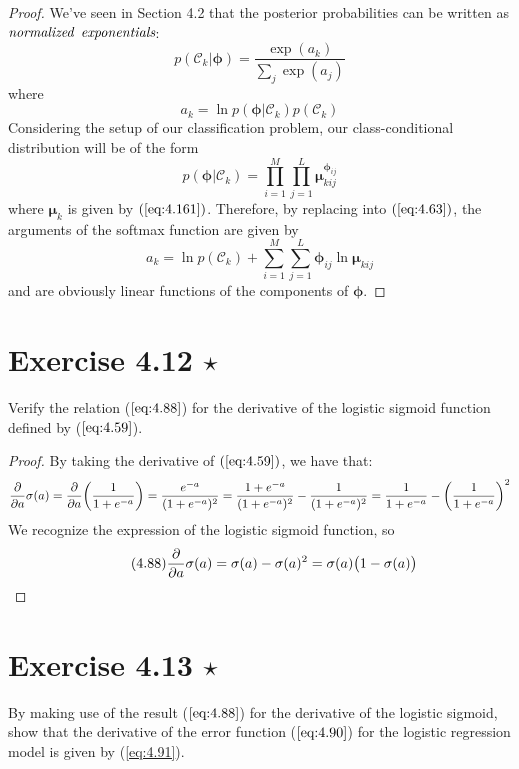 \begin{proof}
    We've seen in Section 4.2 that the posterior probabilities
    can be written as $\emph{normalized}$ $\emph{exponentials}$:
    \begin{equation}\label{eq:4.62}\tag{4.62}
        p(\mathcal{C}_k | \bm{\phi}) 
        = \frac{\exp(a_k)}{\sum_{j} \exp(a_j)}
    \end{equation}
    where
    \begin{equation}\label{eq:4.63}\tag{4.63}
        a_k = \ln p(\bm{\phi} | \mathcal{C}_k)p(\mathcal{C}_k)
    \end{equation}
    Considering the setup of our classification problem,
    our class-conditional distribution will be of the form
    \[
        p(\bm{\phi} | \mathcal{C}_k) 
        = \prod_{i = 1}^M \prod_{j = 1}^L
            \bm{\mu}_{kij}^{\bm{\phi}_{ij}}
    \] 
    where $\bm{\mu}_k$ is given by $(\ref{eq:4.161})$. 
    Therefore,
    by replacing into $(\ref{eq:4.63})$, the arguments
    of the softmax function are given by
    \[
        a_k = \ln p(\mathcal{C}_k) 
        + \sum_{i=1}^{M} \sum_{j=1}^{L} \bm{\phi}_{ij} \ln \bm{\mu}_{kij} 
    \] 
    and are obviously linear functions of the components
    of $\bm{\phi}$.
\end{proof}

\section*{Exercise 4.12 $\star$}
Verify the relation ($\ref{eq:4.88}$) for the derivative of the logistic sigmoid
function defined by ($\ref{eq:4.59}$).

\vspace{1em}

\begin{proof}
    By taking the derivative of $(\ref{eq:4.59})$, we have that: 
    \[
        \pdv{a} \sigma(a) 
        = \pdv{a}\bigg(\frac{1}{1 + e^{-a}}\bigg)
        = \frac{e^{-a}}{(1 + e^{-a})^2}
        = \frac{1 + e^{-a}}{(1 + e^{-a})^2} - \frac{1}{(1 + e^{-a})^2} 
        = \frac{1}{1 + e^{-a}} - \bigg(\frac{1}{1 + e^{-a}}\bigg)^2
    \] 
    We recognize the expression of the logistic sigmoid function, so
    \begin{equation}\label{eq:4.88}\tag{4.88}
        \pdv{a} \sigma(a) = \sigma(a) - \sigma(a)^2 = \sigma(a) \big(1 - \sigma(a)\big)
    \end{equation}
\end{proof}

\section*{Exercise 4.13 $\star$}
By making use of the result ($\ref{eq:4.88}$) for the derivative of the logistic
sigmoid, show that the derivative of the error function ($\ref{eq:4.90}$) for 
the logistic regression model is given by (\ref{eq:4.91}).

